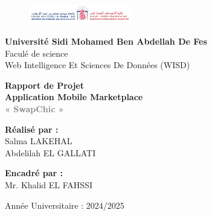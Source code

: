 \documentclass[12pt,a4paper]{report}
\begin{document}
	
	
	\begin{titlepage}
		\begin{center}
			
			\vspace*{-1cm}
			\begin{figure}[h]
				\centering
				\includegraphics[width=0.4\textwidth]{images/logo_university.png}
			\end{figure}
			
			\vspace{1cm}
			
			{\LARGE\textbf{Université Sidi Mohamed Ben Abdellah De Fes}}\\[0.5cm]
			{\Large Faculé de science}\\[0.5cm]
			{\large Web Intelligence Et Sciences De Données (WISD)}
			
			\vspace{2cm}
			
			\begin{tcolorbox}[colback=gray!5,colframe=gray!40,width=\textwidth,arc=0mm]
				\begin{center}
					{\Huge\textbf{Rapport de Projet}}\\[0.5cm]
					{\LARGE\textbf{Application Mobile Marketplace}}\\[0.3cm]
					{\huge\textcolor{gray}{\textbf{« SwapChic »}}}
				\end{center}
			\end{tcolorbox}
			
			\vspace{2cm}
			
			\begin{minipage}{0.4\textwidth}
				\begin{flushleft}
					\large\textbf{Réalisé par :}\\
					Salma LAKEHAL\\
					Abdelilah EL GALLATI
				\end{flushleft}
			\end{minipage}
			\hfill
			\begin{minipage}{0.4\textwidth}
				\begin{flushright}
					\large\textbf{Encadré par :}\\
					Mr. Khalid EL FAHSSI
				\end{flushright}
			\end{minipage}
			
			\vfill
			
			{\large Année Universitaire : 2024/2025}
			
		\end{center}
	\end{titlepage}
	
\end{document}
